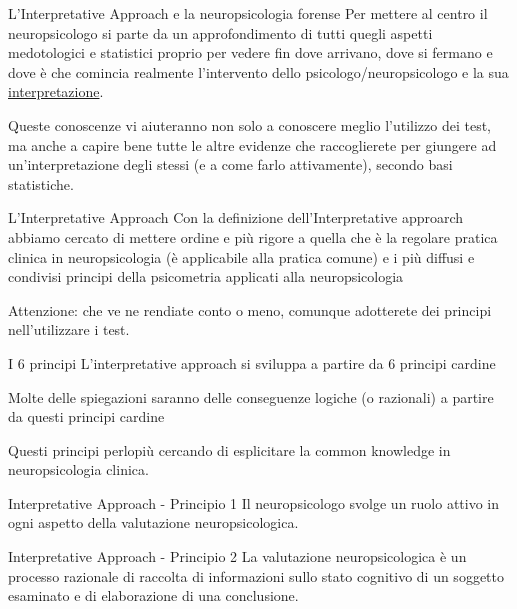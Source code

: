 \documentclass[
  ignorenonframetext,
]{beamer}
\begin{document}
\begin{frame}{L'Interpretative Approach e la neuropsicologia forense}
\label{linterpretative-approach-e-la-neuropsicologia-forense}
Per mettere al centro il neuropsicologo si parte da un approfondimento
di tutti quegli aspetti medotologici e statistici proprio per vedere fin
dove arrivano, dove si fermano e dove è che comincia realmente
l'intervento dello psicologo/neuropsicologo e la sua
\underline{interpretazione}.

Queste conoscenze vi aiuteranno non solo a conoscere meglio l'utilizzo
dei test, ma anche a capire bene tutte le altre evidenze che
raccoglierete per giungere ad un'interpretazione degli stessi (e a come
farlo attivamente), secondo basi statistiche.
\end{frame}

\begin{frame}{L'Interpretative Approach}
\label{linterpretative-approach-1}
Con la definizione dell'Interpretative approarch abbiamo cercato di
mettere ordine e più rigore a quella che è la regolare pratica clinica
in neuropsicologia (è applicabile alla pratica comune) e i più diffusi e
condivisi principi della psicometria applicati alla neuropsicologia

Attenzione: che ve ne rendiate conto o meno, comunque adotterete dei
principi nell'utilizzare i test.
\end{frame}

\begin{frame}{I 6 principi}
\label{i-6-principi}
L'interpretative approach si sviluppa a partire da 6 principi cardine

Molte delle spiegazioni saranno delle conseguenze logiche (o razionali)
a partire da questi principi cardine

Questi principi perlopiù cercando di esplicitare la common knowledge in
neuropsicologia clinica.
\end{frame}

\begin{frame}{Interpretative Approach - Principio 1}
\label{interpretative-approach---principio-1}
Il neuropsicologo svolge un ruolo attivo in ogni aspetto della
valutazione neuropsicologica.
\end{frame}

\begin{frame}{Interpretative Approach - Principio 2}
\label{interpretative-approach---principio-2}
La valutazione neuropsicologica è un processo razionale di raccolta di
informazioni sullo stato cognitivo di un soggetto esaminato e di
elaborazione di una conclusione.
\end{frame}
\end{document}

